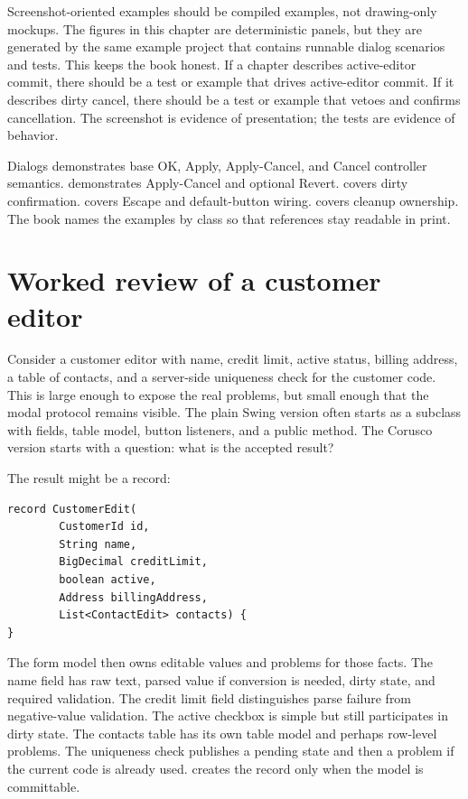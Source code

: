 Screenshot-oriented examples should be compiled examples, not drawing-only
mockups. The figures in this chapter are deterministic panels, but they are
generated by the same example project that contains runnable dialog scenarios
and tests. This keeps the book honest. If a chapter describes active-editor
commit, there should be a test or example that drives active-editor commit. If
it describes dirty cancel, there should be a test or example that vetoes and
confirms cancellation. The screenshot is evidence of presentation; the tests
are evidence of behavior.

\begin{examplebox}{Dialogs}
\dialogExample{} demonstrates base OK, Apply, Apply-Cancel, and Cancel controller semantics.
\dialogApplyRevertExample{} demonstrates Apply-Cancel and optional Revert.
\dialogDirtyCancelExample{} covers dirty confirmation. \dialogKeyboardExample{}
covers Escape and default-button wiring. \dialogLifecycleExample{} covers
cleanup ownership. The book names the examples by class so that references stay
readable in print.
\end{examplebox}

\section{Worked review of a customer editor}

Consider a customer editor with name, credit limit, active status, billing
address, a table of contacts, and a server-side uniqueness check for the
customer code. This is large enough to expose the real problems, but small
enough that the modal protocol remains visible. The plain Swing version often
starts as a  subclass with fields, table model, button listeners,
and a public  method. The Corusco version starts with a
question: what is the accepted result?

The result might be a record:

\begin{lstlisting}[caption={A dialog result should be explicit.}]
record CustomerEdit(
        CustomerId id,
        String name,
        BigDecimal creditLimit,
        boolean active,
        Address billingAddress,
        List<ContactEdit> contacts) {
}
\end{lstlisting}

The form model then owns editable values and problems for those facts. The
name field has raw text, parsed value if conversion is needed, dirty state, and
required validation. The credit limit field distinguishes parse failure from
negative-value validation. The active checkbox is simple but still participates
in dirty state. The contacts table has its own table model and perhaps
row-level problems. The uniqueness check publishes a pending state and then a
problem if the current code is already used.  creates the record
only when the model is committable.

